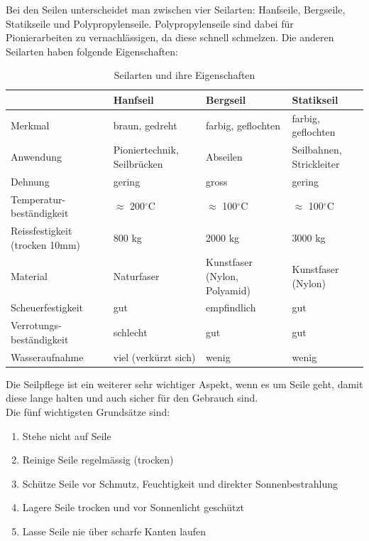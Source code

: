 Bei den Seilen unterscheidet man zwischen vier Seilarten: Hanfseile, Bergseile, Statikseile und Polypropylenseile. Polypropylenseile sind dabei für Pionierarbeiten zu vernachlässigen, da diese schnell schmelzen. Die anderen Seilarten haben folgende Eigenschaften:
\begin{center}
\begin{table}[!h]
\begin{tabularx}{\textwidth}{p{}|X|X|X}
     & \textbf{Hanfseil} & \textbf{Bergseil} & \textbf{Statikseil} \\ \hline
     Merkmal & braun, gedreht & farbig, geflochten & farbig, geflochten \\\hline
     Anwendung & Pioniertechnik, Seilbrücken & Abseilen & Seilbahnen, Strickleiter \\\hline
     Dehnung & gering & gross & gering \\\hline
     Temperatur- beständigkeit & $\approx$ 200$^\circ$C & $\approx$ 100$^\circ$C & $\approx$ 100$^\circ$C \\\hline
     Reissfestigkeit (trocken 10mm) & 800 kg & 2000 kg & 3000 kg \\\hline
     Material & Naturfaser & Kunstfaser (Nylon, Polyamid) & Kunstfaser (Nylon) \\\hline
     Scheuerfestigkeit & gut & empfindlich & gut \\\hline
     Verrotungs- beständigkeit & schlecht & gut & gut \\\hline
     Wasseraufnahme & viel (verkürzt sich) & wenig & wenig \\
\end{tabularx}
\caption{Seilarten und ihre Eigenschaften}
\end{table}
\end{center}
\newpage
Die Seilpflege ist ein weiterer sehr wichtiger Aspekt, wenn es um Seile geht, damit diese lange halten und auch sicher für den Gebrauch sind. \\Die fünf wichtigsten Grundsätze sind:
\begin{enumerate}
\item Stehe nicht auf Seile
\item Reinige Seile regelmässig (trocken)
\item Schütze Seile vor Schmutz, Feuchtigkeit und direkter Sonnenbestrahlung
\item Lagere Seile trocken und vor Sonnenlicht geschützt
\item Lasse Seile nie über scharfe Kanten laufen
\end{enumerate}

